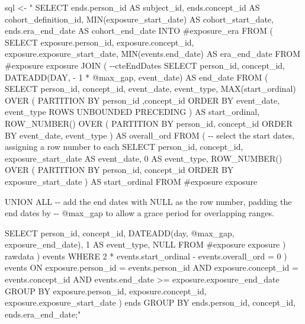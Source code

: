 \documentclass[
  11pt]{book}
\newenvironment{Shaded}{\begin{snugshade}}{\end{snugshade}}
\newcommand{\NormalTok}[1]{#1}
\newcommand{\OtherTok}[1]{\textcolor[rgb]{0.56,0.35,0.01}{#1}}
\newcommand{\StringTok}[1]{\textcolor[rgb]{0.31,0.60,0.02}{#1}}
\theoremstyle{definition}
\theoremstyle{definition}
\theoremstyle{definition}
\theoremstyle{definition}
\theoremstyle{remark}
\begin{document}
\begin{Shaded}
\begin{Highlighting}[]
\NormalTok{sql }\OtherTok{\textless{}{-}} \StringTok{"}
\StringTok{SELECT ends.person\_id AS subject\_id,}
\StringTok{    ends.concept\_id AS cohort\_definition\_id,}
\StringTok{  MIN(exposure\_start\_date) AS cohort\_start\_date,}
\StringTok{  ends.era\_end\_date AS cohort\_end\_date}
\StringTok{INTO \#exposure\_era}
\StringTok{FROM (}
\StringTok{  SELECT exposure.person\_id,}
\StringTok{    exposure.concept\_id,}
\StringTok{    exposure.exposure\_start\_date,}
\StringTok{    MIN(events.end\_date) AS era\_end\_date}
\StringTok{  FROM \#exposure exposure}
\StringTok{  JOIN (}
\StringTok{{-}{-}cteEndDates}
\StringTok{    SELECT person\_id,}
\StringTok{      concept\_id,}
\StringTok{      DATEADD(DAY, {-} 1 * @max\_gap, event\_date) AS end\_date}
\StringTok{    FROM (}
\StringTok{      SELECT person\_id,}
\StringTok{        concept\_id,}
\StringTok{        event\_date,}
\StringTok{        event\_type,}
\StringTok{        MAX(start\_ordinal) OVER (}
\StringTok{          PARTITION BY person\_id ,concept\_id ORDER BY event\_date,}
\StringTok{              event\_type ROWS UNBOUNDED PRECEDING}
\StringTok{          ) AS start\_ordinal,}
\StringTok{        ROW\_NUMBER() OVER (}
\StringTok{          PARTITION BY person\_id, concept\_id ORDER BY event\_date,}
\StringTok{            event\_type}
\StringTok{          ) AS overall\_ord}
\StringTok{      FROM (}
\StringTok{{-}{-} select the start dates, assigning a row number to each}
\StringTok{        SELECT person\_id,}
\StringTok{          concept\_id,}
\StringTok{          exposure\_start\_date AS event\_date,}
\StringTok{          0 AS event\_type,}
\StringTok{          ROW\_NUMBER() OVER (}
\StringTok{            PARTITION BY person\_id, concept\_id ORDER BY exposure\_start\_date}
\StringTok{            ) AS start\_ordinal}
\StringTok{        FROM \#exposure exposure}

\StringTok{        UNION ALL}
\StringTok{{-}{-} add the end dates with NULL as the row number, padding the end dates by}
\StringTok{{-}{-} @max\_gap to allow a grace period for overlapping ranges.}

\StringTok{        SELECT person\_id,}
\StringTok{          concept\_id,}
\StringTok{          DATEADD(day, @max\_gap, exposure\_end\_date),}
\StringTok{          1 AS event\_type,}
\StringTok{          NULL}
\StringTok{        FROM \#exposure exposure}
\StringTok{        ) rawdata}
\StringTok{    ) events}
\StringTok{  WHERE 2 * events.start\_ordinal {-} events.overall\_ord = 0}
\StringTok{  ) events}
\StringTok{  ON exposure.person\_id = events.person\_id}
\StringTok{      AND exposure.concept\_id = events.concept\_id}
\StringTok{      AND events.end\_date \textgreater{}= exposure.exposure\_end\_date}
\StringTok{  GROUP BY exposure.person\_id,}
\StringTok{      exposure.concept\_id,}
\StringTok{      exposure.exposure\_start\_date}
\StringTok{  ) ends}
\StringTok{GROUP BY ends.person\_id,}
\StringTok{  concept\_id,}
\StringTok{  ends.era\_end\_date;"}


\end{Highlighting}
\end{Shaded}
\end{document}
